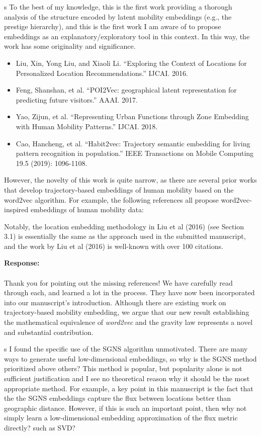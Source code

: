 \documentclass[12pt,a4paper]{article}
\newcommand{\response}[1]{{\noindent \textbf{Response:} \\ \\ \noindent #1}}
\newcommand{\rcomment}[1]{%
\vspace{10pt}
\begin{sectionbox}
s #1
\end{sectionbox}
}
\begin{document}
\rcomment{%
	To the best of my knowledge, this is the first work providing a thorough analysis of the structure encoded by latent mobility embeddings (e.g., the prestige hierarchy), and this is the first work I am aware of to propose embeddings as an explanatory/exploratory tool in this context. In this way, the work has some originality and significance.

	\begin{itemize}
		\item Liu, Xin, Yong Liu, and Xiaoli Li. ``Exploring the Context of Locations for Personalized Location Recommendations.'' IJCAI. 2016.
		\item Feng, Shanshan, et al. ``POI2Vec: geographical latent representation for predicting future visitors.'' AAAI. 2017.
		\item Yao, Zijun, et al. ``Representing Urban Functions through Zone Embedding with Human Mobility Patterns.'' IJCAI. 2018.
		\item Cao, Hancheng, et al. ``Habit2vec: Trajectory semantic embedding for living pattern recognition in population.'' IEEE Transactions on Mobile Computing 19.5 (2019): 1096-1108.
	\end{itemize}


	However, the novelty of this work is quite narrow, as there are several prior works that develop trajectory-based embeddings of human mobility based on the word2vec algorithm. For example, the following references all propose word2vec-inspired embeddings of human mobility data:


	Notably, the location embedding methodology in Liu et al (2016) (see Section 3.1) is essentially the same as the approach used in the submitted manuscript, and the work by Liu et al (2016) is well-known with over 100 citations.
}



\response{Thank you for pointing out the missing references!
	We have carefully read through each, and learned a lot in the process.
	They have now been incorporated into our manuscript's introduction.
	Although there are existing work on trajectory-based mobility embedding, we argue that our new result establishing the mathematical equivalence of \textit{word2vec} and the gravity law represents a novel and substantial contribution. 
}

\rcomment{
	I found the specific use of the SGNS algorithm unmotivated. There are many ways to generate useful low-dimensional embeddings, so why is the SGNS method prioritized above others? This method is popular, but popularity alone is not sufficient justification and I see no theoretical reason why it should be the most appropriate method. For example, a key point in this manuscript is the fact that the the SGNS embeddings capture the flux between locations better than geographic distance. However, if this is such an important point, then why not simply learn a low-dimensional embedding approximation of the flux metric directly? such as SVD?
}
\end{document}

